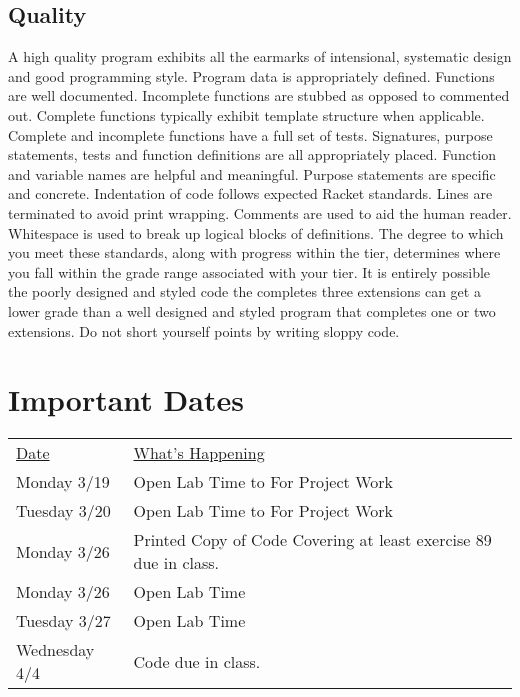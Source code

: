 \documentclass[nobib]{tufte-handout}
\begin{document}
  \subsection*{Quality}

  A high quality program exhibits all the earmarks of intensional, systematic design and good programming style. Program data is appropriately defined. Functions are well documented. Incomplete functions are stubbed as opposed to commented out. Complete functions typically exhibit template structure when applicable. Complete and incomplete functions have a full set of tests. Signatures, purpose statements, tests and function definitions are all appropriately placed.  Function and variable names are helpful and meaningful. Purpose statements are specific and concrete. Indentation of code follows expected Racket standards. Lines are terminated to avoid print wrapping. Comments are used to aid the human reader. Whitespace is used to break up logical blocks of definitions. The degree to which you meet these standards, along with progress within the tier, determines where you fall within the grade range associated with your tier. It is entirely possible the poorly designed and styled code the completes three extensions can get a lower grade than a well designed and styled program that completes one or two extensions. Do not short yourself points by writing sloppy code.


  \section*{Important Dates}

  \begin{tabular}{ll}
    \underline{Date} & \underline{What's Happening} \\
     Monday 3/19 & Open Lab Time to For Project Work \\
     Tuesday 3/20 & Open Lab Time to For Project Work \\
     Monday 3/26 & Printed Copy of Code Covering at least exercise 89 due in class. \\
     Monday 3/26 & Open Lab Time \\
     Tuesday 3/27 & Open Lab Time \\
     Wednesday 4/4 & Code due in class. \\
  \end{tabular}
\end{document}

